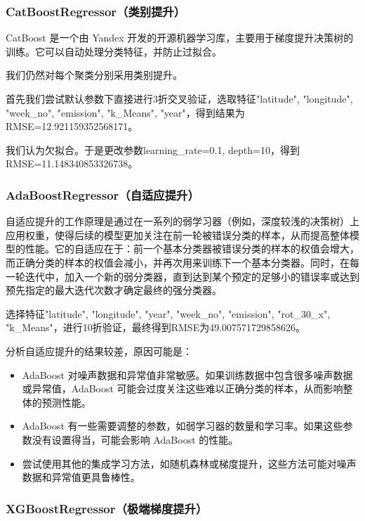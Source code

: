 \documentclass{ctexart}
\begin{document}
\subsubsection{CatBoostRegressor（类别提升）}

CatBoost 是一个由 Yandex 开发的开源机器学习库，主要用于梯度提升决策树的训练。它可以自动处理分类特征，并防止过拟合。

我们仍然对每个聚类分别采用类别提升。

首先我们尝试默认参数下直接进行3折交叉验证，选取特征"latitude", "longitude", "week\_no", "emission", "k\_Means", "year"，得到结果为RMSE=12.921159352568171。

我们认为欠拟合。于是更改参数learning\_rate=0.1, depth=10，得到RMSE=11.148340853326738。

\subsubsection{AdaBoostRegressor（自适应提升）}

自适应提升的工作原理是通过在一系列的弱学习器（例如，深度较浅的决策树）上应用权重，使得后续的模型更加关注在前一轮被错误分类的样本，从而提高整体模型的性能。它的自适应在于：前一个基本分类器被错误分类的样本的权值会增大，而正确分类的样本的权值会减小，并再次用来训练下一个基本分类器。同时，在每一轮迭代中，加入一个新的弱分类器，直到达到某个预定的足够小的错误率或达到预先指定的最大迭代次数才确定最终的强分类器。

选择特征"latitude", "longitude", "year", "week\_no", "emission", "rot\_30\_x", "k\_Means"，进行10折验证，最终得到RMSE为49.007571729858626。

分析自适应提升的结果较差，原因可能是：

\begin{itemize}
      \item AdaBoost 对噪声数据和异常值非常敏感。如果训练数据中包含很多噪声数据或异常值，AdaBoost 可能会过度关注这些难以正确分类的样本，从而影响整体的预测性能。
      \item AdaBoost 有一些需要调整的参数，如弱学习器的数量和学习率。如果这些参数没有设置得当，可能会影响 AdaBoost 的性能。
      \item 尝试使用其他的集成学习方法，如随机森林或梯度提升，这些方法可能对噪声数据和异常值更具鲁棒性。
\end{itemize}

\subsubsection{XGBoostRegressor（极端梯度提升）}
\end{document}
